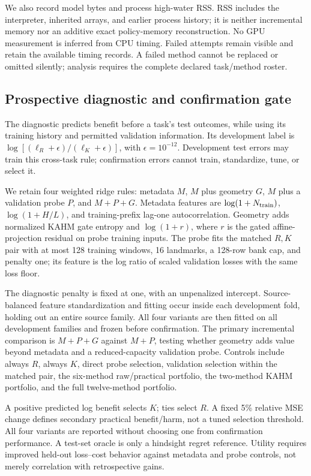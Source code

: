 We also record model bytes and process high-water RSS.  RSS includes the
interpreter, inherited arrays, and earlier process history; it is neither
incremental memory nor an additive exact policy-memory reconstruction.  No
GPU measurement is inferred from CPU timing.  Failed attempts remain visible
and retain the available timing records.  A failed method cannot be replaced
or omitted silently; analysis requires the complete declared task/method roster.

\subsection{Prospective diagnostic and confirmation gate}
\label{sec:nf-diagnostic}

The diagnostic predicts benefit before a task's test outcomes, while using
its training history and permitted validation information.  Its development
label is $\log[(\ell_R+\epsilon)/(\ell_K+\epsilon)]$, with
$\epsilon=10^{-12}$.  Development test errors may train this cross-task rule;
confirmation errors cannot train, standardize, tune, or select it.

We retain four weighted ridge rules: metadata $M$, $M$ plus geometry $G$,
$M$ plus a validation probe $P$, and $M+P+G$.  Metadata features are
$\log(1+N_{\rm train})$, $\log(1+H/L)$, and training-prefix lag-one
autocorrelation.  Geometry adds normalized KAHM gate entropy and
$\log(1+r)$, where $r$ is the gated affine-projection residual on probe training
inputs.  The probe fits the matched $R,K$ pair with at most 128 training
windows, 16 landmarks, a 128-row bank cap, and penalty one; its feature is
the log ratio of scaled validation losses with the same loss floor.

The diagnostic penalty is fixed at one, with an unpenalized intercept.
Source-balanced feature standardization and fitting occur inside each
development fold, holding out an entire source family.  All four variants are
then fitted on all development families and frozen before confirmation.
The primary incremental comparison is $M+P+G$ against $M+P$, testing whether
geometry adds value beyond metadata and a reduced-capacity validation probe.
Controls include always $R$, always $K$, direct probe selection, validation
selection within the matched pair, the six-method raw/practical portfolio,
the two-method KAHM portfolio, and the full twelve-method portfolio.

A positive predicted log benefit selects $K$; ties select $R$.  A fixed 5\%
relative MSE change defines secondary practical benefit/harm, not a tuned
selection threshold.  All four variants are reported without choosing one from
confirmation performance.  A test-set oracle is only a hindsight regret
reference.  Utility requires improved held-out loss--cost behavior against
metadata and probe controls, not merely correlation with retrospective gains.

